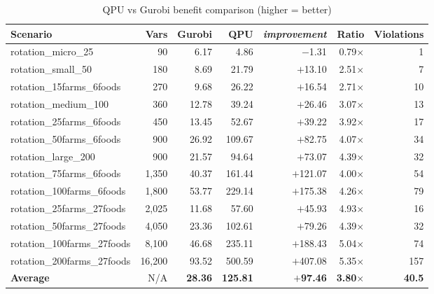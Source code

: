 \begin{table}[H]
\centering
\caption{QPU vs Gurobi benefit comparison (higher = better)}
\label{tab:qpu_advantage}
\small
\begin{adjustbox}{max width = \textwidth}
\begin{tabular}{lrrrrrr}
\toprule
\textbf{Scenario} & \textbf{Vars} & \textbf{Gurobi} & \textbf{QPU} & \textbf{\textit{improvement}} & \textbf{Ratio} & \textbf{Violations} \\
\midrule
rotation\_micro\_25 & 90 & 6.17 & 4.86 & $-$1.31 & 0.79$\times$ & 1 \\
rotation\_small\_50 & 180 & 8.69 & 21.79 & $+$13.10 & 2.51$\times$ & 7 \\
rotation\_15farms\_6foods & 270 & 9.68 & 26.22 & $+$16.54 & 2.71$\times$ & 10 \\
rotation\_medium\_100 & 360 & 12.78 & 39.24 & $+$26.46 & 3.07$\times$ & 13 \\
rotation\_25farms\_6foods & 450 & 13.45 & 52.67 & $+$39.22 & 3.92$\times$ & 17 \\
rotation\_50farms\_6foods & 900 & 26.92 & 109.67 & $+$82.75 & 4.07$\times$ & 34 \\
rotation\_large\_200 & 900 & 21.57 & 94.64 & $+$73.07 & 4.39$\times$ & 32 \\
rotation\_75farms\_6foods & 1,350 & 40.37 & 161.44 & $+$121.07 & 4.00$\times$ & 54 \\
rotation\_100farms\_6foods & 1,800 & 53.77 & 229.14 & $+$175.38 & 4.26$\times$ & 79 \\
rotation\_25farms\_27foods & 2,025 & 11.68 & 57.60 & $+$45.93 & 4.93$\times$ & 16 \\
rotation\_50farms\_27foods & 4,050 & 23.36 & 102.61 & $+$79.26 & 4.39$\times$ & 32 \\
rotation\_100farms\_27foods & 8,100 & 46.68 & 235.11 & $+$188.43 & 5.04$\times$ & 74 \\
rotation\_200farms\_27foods & 16,200 & 93.52 & 500.59 & $+$407.08 & 5.35$\times$ & 157 \\
\midrule
\textbf{Average} & N/A & \textbf{28.36} & \textbf{125.81} & \textbf{$+$97.46} & \textbf{3.80$\times$} & \textbf{40.5} \\
\bottomrule
\end{tabular}
\end{adjustbox}
\end{table}

